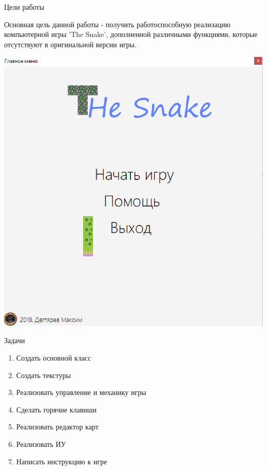 \documentclass[size=14pt,paper=screen,style=paintings]{powerdot}
\title{\vspace*{-1cm}{\large Компьютерная игра 'The Snake'}}
\author{\noindent Дегтярев Максим Эдуардович  
\and Научный руководитель: \and доцент кафедры 813
 Мокряков  \and Алексей Викторович}
\begin{document}
\maketitle


\begin{slide}{{\normalsize Цели работы}}

Основная цель данной работы - получить работоспособную реализацию компьютерной игры 'The Snake', дополненной различными функциями, которые отсутствуют в оригинальной версии игры.
\begin{center}
\includegraphics[scale=0.3]{img2.eps}
\end{center}
\end{slide}

\begin{slide}{{\normalsize Задачи}}
\begin{enumerate}
\vspace*{1cm}
\item Создать основной класс
\item Создать текстуры
\item Реализовать управление и механику игры
\item Сделать горячие клавиши
\item Реализовать редактор карт
\item Реализовать ИУ
\item Написать инструкцию к игре
\end{enumerate}
\end{slide}
\end{document}
